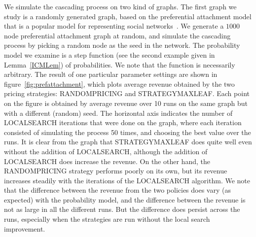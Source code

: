 \documentclass[letterpaper,twoside]{article}
\newcommand{\strategyml}{\textrm{S{\scriptsize TRATEGY}\-M{\scriptsize AX}\-L{\scriptsize EAF}}}
\newcommand{\LS}{\textrm{L{\scriptsize OCAL}\-S{\scriptsize EARCH}}}
\newcommand{\rand}{\textrm{R{\scriptsize ANDOM}\-P{\scriptsize RICING}}}
\begin{document}
\begin{figure*}[htpb]
  \centering
  \label{fig:revenue}
  \caption{The variation in revenue generated by \rand{} and \strategyml{} with
    the iterations of the \LS{} algorithm. The data is averaged over $10$ runs
    of a $1000$ node random preferential attachment
    graph~ or a $10000$ node subgraph of
    YouTube~, starting with a random seed each time.}
\end{figure*}

We simulate the cascading process on two kind of graphs. The first graph we
study is a randomly generated graph, based on the preferential attachment
model that is a popular model for representing social
networks~\cite{NWS02}. We generate a $1000$ node preferential attachment
graph at random, and simulate the cascading process by picking a random node
as the seed in the network. The probability model we examine is a step
function (see the second example given in Lemma~\ref{ICMLem}) of
probabilities. We note that the function is necessarily arbitrary. The
result of one particular parameter settings are shown in
figure~\ref{fig:prefattachment}, which plots average revenue obtained by the
two pricing strategies: \rand{} and \strategyml. Each point on the figure is
obtained by average revenue over 10 runs on the same graph but with a
different (random) seed.  The horizontal axis indicates the number of \LS{}
iterations that were done on the graph, where each iteration consisted of
simulating the process 50 times, and choosing the best value over the
runs. It is clear from the graph that \strategyml{} does quite well even
without the addition of \LS{}, although the addition of \LS{} does increase
the revenue. On the other hand, the \rand{} strategy performs poorly on its
own, but its revenue increases steadily with the iterations of the \LS{}
algorithm. We note that the difference between the revenue from the two
policies does vary (as expected) with the probability model, and the
difference between the revenue is not as large in all the different runs. But
the difference does persist across the runs, especially when the strategies
are run without the local search improvement.
\end{document}
